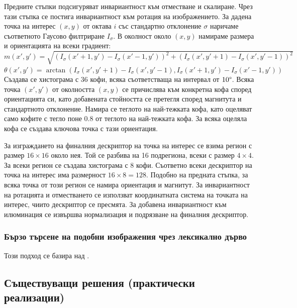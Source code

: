 \documentclass[a4paper,12pt]{article}
\begin{document}
\bigbreak

Предните стъпки подсигуряват инвариантност към отместване и скалиране. Чрез тази стъпка се постига инвариантност към ротация на изображението. За дадена точка на интерес $(x, y)$ от октава $i$ със стандартно отклонение $\sigma$ наричаме съответното Гаусово филтриране $I_{\sigma}$. В околност около $(x, y)$ намираме размера и ориентацията на всеки градиент: \\

$m(x', y') = \sqrt{(I_{\sigma}(x'+1,y') - I_{\sigma}(x'-1,y'))^2 + (I_{\sigma}(x', y'+1) - I_{\sigma}(x', y'-1))^2}$ \\
$\theta(x', y') = \arctan(I_{\sigma}(x',y'+1) - I_{\sigma}(x',y'-1), I_{\sigma}(x'+1,y') - I_{\sigma}(x'-1, y'))$ \\

Създава се хистограма с 36 кофи, всяка съответстваща на интервал от $10\degree$. Всяка точка $(x', y')$ от околността $(x, y)$ се причислява към конкретна кофа според ориентацията си, като добавената стойността се претегля според магнитута и стандартното отклонение. Намира се теглото на най-тежката кофа, като оцеляват само кофите с тегло поне $0.8$ от теглото на най-тежката кофа. За всяка оцеляла кофа се създава ключова точка с тази ориентация.

\bigbreak

За изграждането на финалния дескриптор на точка на интерес се взима регион с размер $16 \times 16$ около нея. Той се разбива на 16 подрегиона, всеки с размер $4 \times 4$. За всеки регион се създава хистограма с 8 кофи. Съответно всеки дескриптор на точка на интерес има размерност $16 \times 8 = 128$. Подобно на предната стъпка, за всяка точка от този регион се намира ориентация и магнитут. За инвариантност на ротацията и отместването се използват координатната система на точката на интерес, чиито дескриптор се пресмята. За добавена инвариантност към илюминация се извършва нормализация и подрязване на финалния дескриптор.

\subsubsection{Бързо търсене на подобни изображения чрез лексикално дърво}

Този подход се базира над \cite{vocabularytree}.

\subsection{Съществуващи решения (практически реализации)}
\end{document}
